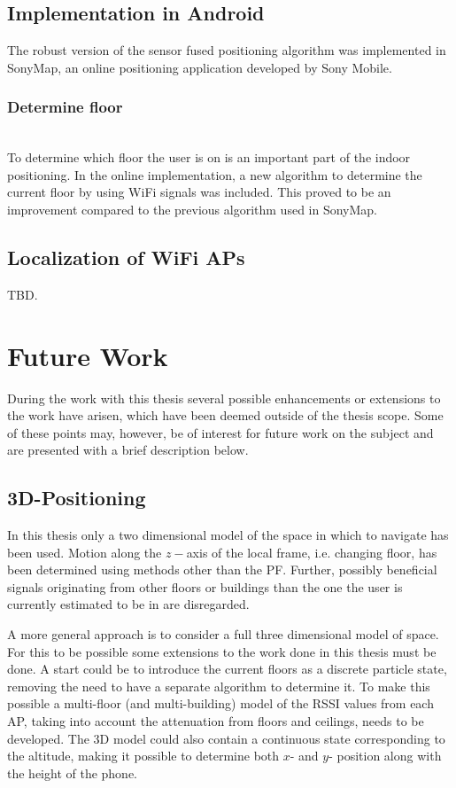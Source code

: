 \documentclass{LTHthesis}
\begin{document}
\subsection{Implementation in Android}
The robust version of the sensor fused positioning algorithm was implemented in SonyMap, an online positioning application developed by Sony Mobile.

\subsubsection{Determine floor} ~\\
To determine which floor the user is on is an important part of the indoor positioning. In the online implementation, a new algorithm to determine the current floor by using WiFi signals was included. This proved to be an improvement compared to the previous algorithm used in SonyMap.



\subsection{Localization of WiFi APs}
TBD.


\section{Future Work}
%
During the work with this thesis several possible enhancements or extensions to the work have arisen, which have been deemed outside of the thesis scope. Some of these points may, however, be of interest for future work on the subject and are presented with a brief description below. 
%
\subsection{3D-Positioning}
%
In this thesis only a two dimensional model of the space in which to navigate has been used. Motion along the $z-$axis of the local frame, i.e. changing floor, has been determined using methods other than the PF. Further, possibly beneficial signals originating from other floors or buildings than the one the user is currently estimated to be in are disregarded.

A more general approach is to consider a full three dimensional model of space. For this to be possible some extensions to the work done in this thesis must be done. A start could be to introduce the current floors as a discrete particle state, removing the need to have a separate algorithm to determine it. To make this possible a multi-floor (and multi-building) model of the RSSI values from each AP, taking into account the attenuation from floors and ceilings, needs to be developed. The 3D model could also contain a continuous state corresponding to the altitude, making it possible to determine both $x$- and $y$- position along with the height of the phone. 
%
\end{document}
